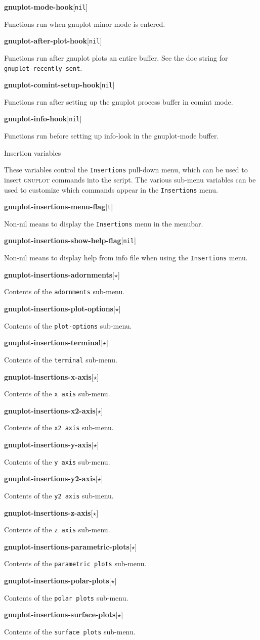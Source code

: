 \documentclass[twocolumn]{article}
\newenvironment{Boxedminipage}%
{\begin{Sbox}\begin{minipage}}%
  {\end{minipage}\end{Sbox}\Ovalbox{\TheSbox}}
\def\variable#1#2#3{{
    \vspace{-0.2truecm}
    \begin{flushright}
      \begin{minipage}[h]{0.97\linewidth}
        \vspace{-0.2truecm}
        \textbf{#1}\hfill[\texttt{#2}]
        \begin{flushright}
          \begin{minipage}[h]{0.93\linewidth}
            \vspace{-0.2truecm}
            #3
          \end{minipage}
        \end{flushright}
      \end{minipage}
    \end{flushright}
    }}
\def\Star{{$\star$}}
\begin{document}
\variable{gnuplot-mode-hook}{nil}{Functions run when gnuplot minor
  mode is entered.}
%
\variable{gnuplot-after-plot-hook}{nil}{Functions run after gnuplot
  plots an entire buffer.  See the doc string for
  \texttt{gnuplot-recently-sent}.}
%
\variable{gnuplot-comint-setup-hook}{nil}{Functions run after setting
  up the gnuplot process buffer in comint mode.}
%
\variable{gnuplot-info-hook}{nil}{Functions run before setting up
  info-look in the gnuplot-mode buffer.}



\begin{center}
  \begin{Boxedminipage}{0.75\linewidth}
    \begin{center}
      {\large Insertion variables}
    \end{center}
  \end{Boxedminipage}
\end{center}

\noindent These variables control the \texttt{Insertions} pull-down
menu, which can be used to insert \textsc{gnuplot} commands into the
script.  The various sub-menu variables can be used to customize which
commands appear in the \texttt{Insertions} menu.

\vspace{2ex}
%
\variable{gnuplot-insertions-menu-flag}{t}{Non-nil means to display
  the \texttt{Insertions} menu in the menubar.}
%
\variable{gnuplot-insertions-show-help-flag}{nil}{Non-nil means to
  display help from info file when using the \texttt{Insertions}
  menu.}
%
\variable{gnuplot-insertions-adornments}{\Star}{Contents of the
  \texttt{adornments} sub-menu.}
%
\variable{gnuplot-insertions-plot-options}{\Star}{Contents of the
  \texttt{plot-options} sub-menu.}
%
\variable{gnuplot-insertions-terminal}{\Star}{Contents of the
  \texttt{terminal} sub-menu.}
%
\variable{gnuplot-insertions-x-axis}{\Star}{Contents of the \texttt{x
    axis} sub-menu.}
%
\variable{gnuplot-insertions-x2-axis}{\Star}{Contents of the \texttt{x2
    axis} sub-menu.}
%
\variable{gnuplot-insertions-y-axis}{\Star}{Contents of the \texttt{y
    axis} sub-menu.}
%
\variable{gnuplot-insertions-y2-axis}{\Star}{Contents of the \texttt{y2
    axis} sub-menu.}
%
\variable{gnuplot-insertions-z-axis}{\Star}{Contents of the \texttt{z
    axis} sub-menu.}
%
\variable{gnuplot-insertions-parametric-plots}{\Star}{Contents of the
  \texttt{parametric plots} sub-menu.}
%
\variable{gnuplot-insertions-polar-plots}{\Star}{Contents of the
  \texttt{polar plots} sub-menu.}
%
\variable{gnuplot-insertions-surface-plots}{\Star}{Contents of the
  \texttt{surface plots} sub-menu.}
\end{document}
